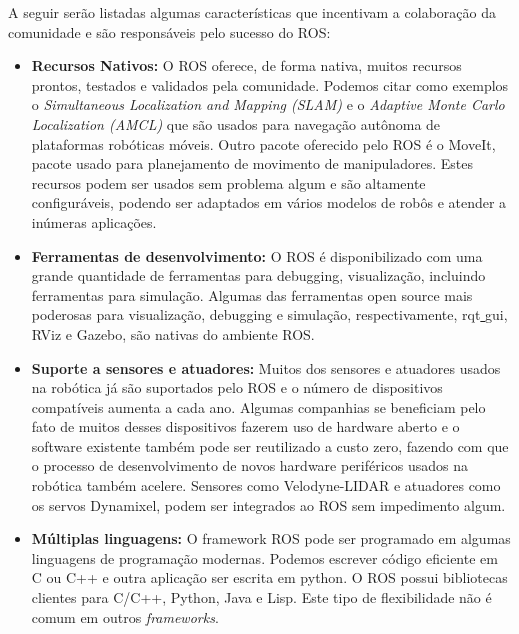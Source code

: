 A seguir serão listadas algumas características que incentivam a colaboração da comunidade e são responsáveis pelo sucesso do ROS\@:

\begin{itemize}
    \item\textbf{Recursos Nativos:} O ROS oferece, de forma nativa, muitos recursos prontos, testados e validados pela comunidade. Podemos citar como exemplos o \textit{Simultaneous Localization and Mapping (SLAM)} e o \textit{Adaptive Monte Carlo Localization (AMCL)} que são usados para navegação autônoma de plataformas robóticas móveis. Outro pacote oferecido pelo ROS é o MoveIt, pacote usado para planejamento de movimento de manipuladores. Estes recursos podem ser usados sem problema algum e são altamente configuráveis, podendo ser adaptados em vários modelos de robôs e atender a inúmeras aplicações. 

    \item\textbf{Ferramentas de desenvolvimento:} O ROS é disponibilizado com uma grande quantidade de ferramentas para debugging, visualização, incluindo ferramentas para simulação. Algumas das ferramentas open source mais poderosas para visualização, debugging e  simulação, respectivamente, rqt\underline{ }gui, RViz e Gazebo, são nativas do ambiente ROS\@.
    
    \item\textbf{Suporte a sensores e atuadores:} Muitos dos sensores e atuadores usados na robótica já são suportados pelo ROS e o número de dispositivos compatíveis aumenta a cada ano. Algumas companhias se beneficiam pelo fato de muitos desses dispositivos fazerem uso de hardware aberto e o software existente também pode ser reutilizado a custo zero, fazendo com que o processo de desenvolvimento de novos hardware periféricos usados na robótica também acelere. Sensores como Velodyne-LIDAR e atuadores como os servos Dynamixel, podem ser integrados ao ROS sem impedimento algum.
    
    \item\textbf{Múltiplas linguagens:} O framework ROS pode ser programado em algumas linguagens de programação modernas. Podemos escrever código eficiente em C ou C++ e outra aplicação ser escrita em python. O ROS possui bibliotecas clientes para C/C++, Python, Java e Lisp. Este tipo de flexibilidade não é comum em outros \textit{frameworks}.
    
\end{itemize}


